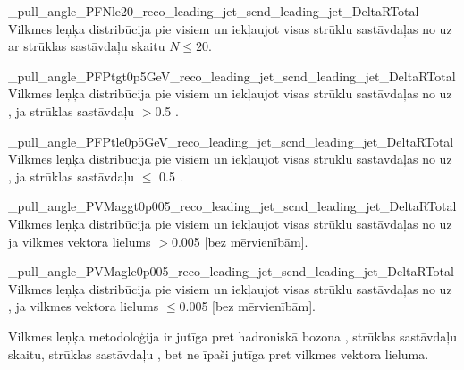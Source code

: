           {_pull_angle_PFNle20_reco_leading_jet_scnd_leading_jet_DeltaRTotal}
          {Vilkmes leņķa distribūcija pie visiem \DeltaR un iekļaujot visas strūklu sastāvdaļas no \leadingjet uz \scndleadingjet ar strūklas sastāvdaļu skaitu $N\leq20$.}

          {_pull_angle_PFPtgt0p5GeV_reco_leading_jet_scnd_leading_jet_DeltaRTotal}
          {Vilkmes leņķa distribūcija pie visiem \DeltaR un iekļaujot visas strūklu sastāvdaļas no \leadingjet uz \scndleadingjet, ja strūklas sastāvdaļu \pt$>$0.5 \GeV.}

          {_pull_angle_PFPtle0p5GeV_reco_leading_jet_scnd_leading_jet_DeltaRTotal}
          {Vilkmes leņķa distribūcija pie visiem \DeltaR un iekļaujot visas strūklu sastāvdaļas no \leadingjet uz \scndleadingjet, ja strūklas sastāvdaļu \pt $\leq$ 0.5 \GeV.}

          {_pull_angle_PVMaggt0p005_reco_leading_jet_scnd_leading_jet_DeltaRTotal}
          {Vilkmes leņķa distribūcija pie visiem \DeltaR un iekļaujot visas strūklu sastāvdaļas no \leadingjet uz \scndleadingjet ja vilkmes vektora lielums $> $0.005 [bez mērvienībām].}

          {_pull_angle_PVMagle0p005_reco_leading_jet_scnd_leading_jet_DeltaRTotal}
          {Vilkmes leņķa distribūcija pie visiem \DeltaR un iekļaujot visas strūklu sastāvdaļas no \leadingjet uz \scndleadingjet, ja vilkmes vektora lielums $\leq$0.005 [bez mērvienībām].}

Vilkmes leņķa metodoloģija ir jutīga pret hadroniskā \PW bozona \pt, strūklas sastāvdaļu skaitu, strūklas sastāvdaļu \pt, bet ne īpaši jutīga pret vilkmes vektora lieluma. 

